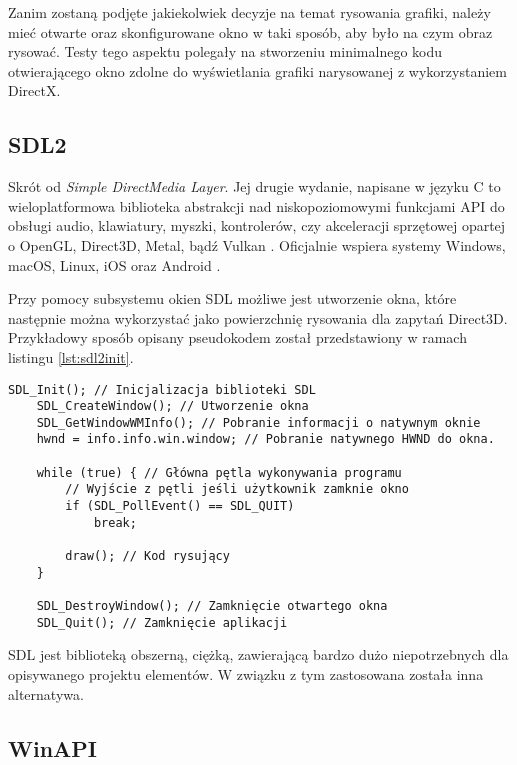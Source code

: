 Zanim zostaną podjęte jakiekolwiek decyzje na temat rysowania grafiki,
należy mieć otwarte oraz skonfigurowane okno w taki sposób, aby było na
czym obraz rysować. Testy tego aspektu polegały na stworzeniu minimalnego kodu otwierającego
okno zdolne do wyświetlania grafiki narysowanej z wykorzystaniem DirectX.

\subsection{SDL2}

Skrót od \emph{Simple DirectMedia Layer}. Jej drugie wydanie, napisane w
języku C to wieloplatformowa biblioteka abstrakcji nad niskopoziomowymi
funkcjami API do obsługi audio, klawiatury, myszki, kontrolerów, czy
akceleracji sprzętowej opartej o OpenGL, Direct3D, Metal, bądź Vulkan
\cite{sdl:wiki:2024}. Oficjalnie wspiera systemy Windows, macOS, Linux, iOS oraz
Android \cite{sdl:wiki:2024}. 

Przy pomocy subsystemu okien SDL możliwe jest utworzenie okna, które
następnie można wykorzystać jako powierzchnię rysowania dla zapytań
Direct3D. Przykładowy sposób opisany pseudokodem został przedstawiony w ramach listingu \ref{lst:sdl2init}.

\vfill

\begin{lstlisting}[caption={Pseudokod inicjalizacji okna SDL2 (oryginalna treść)}, label={lst:sdl2init}]
	SDL_Init(); // Inicjalizacja biblioteki SDL
	SDL_CreateWindow(); // Utworzenie okna
	SDL_GetWindowWMInfo(); // Pobranie informacji o natywnym oknie
	hwnd = info.info.win.window; // Pobranie natywnego HWND do okna.
	
	while (true) { // Główna pętla wykonywania programu
		// Wyjście z pętli jeśli użytkownik zamknie okno
		if (SDL_PollEvent() == SDL_QUIT)
			break;
	
		draw(); // Kod rysujący
	}
		
	SDL_DestroyWindow(); // Zamknięcie otwartego okna
	SDL_Quit(); // Zamknięcie aplikacji
\end{lstlisting}

SDL jest biblioteką obszerną, ciężką, zawierającą bardzo dużo
niepotrzebnych dla opisywanego projektu elementów. W związku z tym
zastosowana została inna alternatywa.

\subsection{WinAPI}

